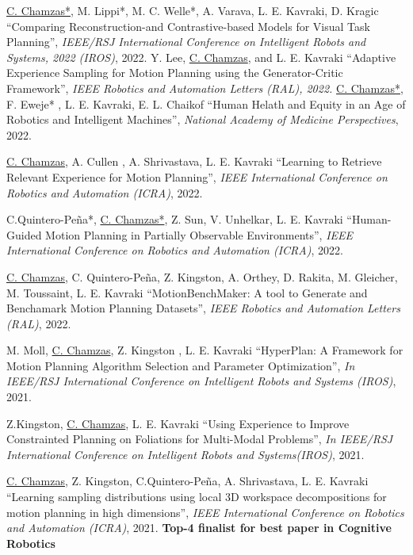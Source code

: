 \documentclass[letterpaper,11pt]{article}
\begin{document}
\begin{thebibliography}{9}
	\underline{C. Chamzas*}, M. Lippi*, M. C. Welle*, A. Varava, L. E. Kavraki, D. Kragic 
	``Comparing Reconstruction-and Contrastive-based Models for Visual Task Planning'',
	\textit{IEEE/RSJ International Conference on Intelligent Robots and Systems, 2022 (IROS)}, 2022.
	 Y. Lee, \underline{C. Chamzas}, and L. E. Kavraki 
	``Adaptive Experience Sampling for Motion Planning using the Generator-Critic Framework'',
	\textit{IEEE Robotics and Automation Letters (RAL), 2022.}
     \underline{C. Chamzas*}, F. Eweje* , L. E. Kavraki, E. L. Chaikof 
	``Human Helath and Equity in an Age of Robotics and Intelligent Machines'',
    \textit{National Academy of Medicine Perspectives}, 2022.

     \underline{C. Chamzas}, A. Cullen , A. Shrivastava, L. E. Kavraki
	``Learning to Retrieve Relevant Experience for Motion Planning'',
    \textit{IEEE International Conference on Robotics and Automation (ICRA)}, 2022.

     C.Quintero-Peña*, \underline{C. Chamzas*}, Z. Sun, V. Unhelkar, L. E. Kavraki
	``Human-Guided Motion Planning in Partially Observable Environments'',
    \textit{IEEE International Conference on Robotics and Automation (ICRA)}, 2022.

     \underline{C. Chamzas}, C. Quintero-Peña, Z. Kingston, A. Orthey, D. Rakita, M. Gleicher, M. Toussaint, L. E. Kavraki      ``MotionBenchMaker: A tool to Generate and Benchamark Motion Planning Datasets'',
     \textit{IEEE Robotics and Automation Letters (RAL)}, 2022.  

     M. Moll, \underline{C. Chamzas}, Z. Kingston , L. E. Kavraki
     ``HyperPlan: A Framework for Motion Planning Algorithm Selection and Parameter Optimization'',
     \textit{In IEEE/RSJ International Conference on Intelligent Robots and Systems (IROS)}, 2021.  

     Z.Kingston, \underline{C. Chamzas}, L. E. Kavraki
     ``Using Experience to Improve Constrainted Planning on Foliations for Multi-Modal Problems'',
     \textit{In IEEE/RSJ International Conference on Intelligent Robots and Systems(IROS)}, 2021.  

    \underline{C. Chamzas}, Z. Kingston, C.Quintero-Peña, A. Shrivastava, L. E. Kavraki
	``Learning sampling distributions using local 3D workspace decompositions for motion planning in high dimensions'',
    \textit{IEEE International Conference on Robotics and Automation (ICRA)}, 2021.
    \textbf{Top-4 finalist for best paper in Cognitive Robotics} 


\end{thebibliography}
\end{document}
